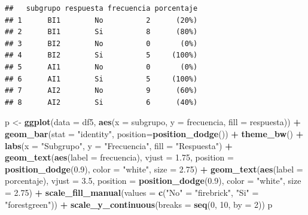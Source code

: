 \documentclass[
]{article}
\newenvironment{Shaded}{\begin{snugshade}}{\end{snugshade}}
\newcommand{\AttributeTok}[1]{\textcolor[rgb]{0.13,0.29,0.53}{#1}}
\newcommand{\DecValTok}[1]{\textcolor[rgb]{0.00,0.00,0.81}{#1}}
\newcommand{\FloatTok}[1]{\textcolor[rgb]{0.00,0.00,0.81}{#1}}
\newcommand{\FunctionTok}[1]{\textcolor[rgb]{0.13,0.29,0.53}{\textbf{#1}}}
\newcommand{\NormalTok}[1]{#1}
\newcommand{\OtherTok}[1]{\textcolor[rgb]{0.56,0.35,0.01}{#1}}
\newcommand{\SpecialCharTok}[1]{\textcolor[rgb]{0.81,0.36,0.00}{\textbf{#1}}}
\newcommand{\StringTok}[1]{\textcolor[rgb]{0.31,0.60,0.02}{#1}}
\begin{document}
\begin{verbatim}
##   subgrupo respuesta frecuencia porcentaje
## 1      BI1        No          2      (20%)
## 2      BI1        Si          8      (80%)
## 3      BI2        No          0       (0%)
## 4      BI2        Si          5     (100%)
## 5      AI1        No          0       (0%)
## 6      AI1        Si          5     (100%)
## 7      AI2        No          9      (60%)
## 8      AI2        Si          6      (40%)
\end{verbatim}

\begin{Shaded}
\begin{Highlighting}[]
\NormalTok{p }\OtherTok{\textless{}{-}} \FunctionTok{ggplot}\NormalTok{(}\AttributeTok{data =}\NormalTok{ df5, }\FunctionTok{aes}\NormalTok{(}\AttributeTok{x =}\NormalTok{ subgrupo, }\AttributeTok{y =}\NormalTok{ frecuencia, }\AttributeTok{fill =}\NormalTok{ respuesta)) }\SpecialCharTok{+} 
  \FunctionTok{geom\_bar}\NormalTok{(}\AttributeTok{stat =} \StringTok{"identity"}\NormalTok{, }\AttributeTok{position=}\FunctionTok{position\_dodge}\NormalTok{()) }\SpecialCharTok{+}
  \FunctionTok{theme\_bw}\NormalTok{() }\SpecialCharTok{+} \FunctionTok{labs}\NormalTok{(}\AttributeTok{x =} \StringTok{"Subgrupo"}\NormalTok{, }\AttributeTok{y =} \StringTok{"Frecuencia"}\NormalTok{, }\AttributeTok{fill =} \StringTok{"Respuesta"}\NormalTok{) }\SpecialCharTok{+}
  \FunctionTok{geom\_text}\NormalTok{(}\FunctionTok{aes}\NormalTok{(}\AttributeTok{label =}\NormalTok{ frecuencia), }\AttributeTok{vjust =} \FloatTok{1.75}\NormalTok{, }\AttributeTok{position =} \FunctionTok{position\_dodge}\NormalTok{(}\FloatTok{0.9}\NormalTok{), }
            \AttributeTok{color =} \StringTok{"white"}\NormalTok{, }\AttributeTok{size =} \FloatTok{2.75}\NormalTok{) }\SpecialCharTok{+}
  \FunctionTok{geom\_text}\NormalTok{(}\FunctionTok{aes}\NormalTok{(}\AttributeTok{label =}\NormalTok{ porcentaje), }\AttributeTok{vjust =} \FloatTok{3.5}\NormalTok{, }\AttributeTok{position =} \FunctionTok{position\_dodge}\NormalTok{(}\FloatTok{0.9}\NormalTok{), }
            \AttributeTok{color =} \StringTok{"white"}\NormalTok{, }\AttributeTok{size =} \FloatTok{2.75}\NormalTok{) }\SpecialCharTok{+}
  \FunctionTok{scale\_fill\_manual}\NormalTok{(}\AttributeTok{values =} \FunctionTok{c}\NormalTok{(}\StringTok{"No"} \OtherTok{=} \StringTok{"firebrick"}\NormalTok{, }\StringTok{"Si"} \OtherTok{=} \StringTok{"forestgreen"}\NormalTok{)) }\SpecialCharTok{+}
  \FunctionTok{scale\_y\_continuous}\NormalTok{(}\AttributeTok{breaks =} \FunctionTok{seq}\NormalTok{(}\DecValTok{0}\NormalTok{, }\DecValTok{10}\NormalTok{, }\AttributeTok{by =} \DecValTok{2}\NormalTok{))}
\NormalTok{p}
\end{Highlighting}
\end{Shaded}
\end{document}
